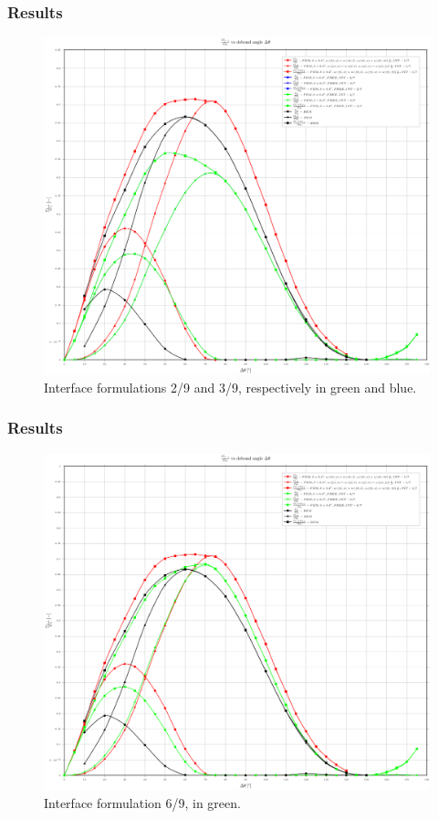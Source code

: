 \documentclass[first,firstsupp,lastsupp,handout,last,hyperref,table]{ETHclass}
\begin{document}
\begin{frame}
\frametitle{Results}
\vspace{-0.7cm}
\centering
\captionsetup[figure]{font=scriptsize,labelfont=scriptsize}
\begin{figure}[!h]
\centering
\includegraphics[height=0.7\textheight]{2017-04-29_05-03_AbqRunSummary_GsoverG0_FEM-BEM-comparison.pdf}
  \caption{\scriptsize Interface formulations 2/9 and 3/9, respectively in green and blue.}
  \label{fig:res3}
\end{figure}
\end{frame}

\begin{frame}
\frametitle{Results}
\vspace{-0.7cm}
\centering
\captionsetup[figure]{font=scriptsize,labelfont=scriptsize}
\begin{figure}[!h]
\centering
\includegraphics[height=0.7\textheight]{2017-06-01_AbqRunSummary_GsoverG0_FEM-BEM-comparison.pdf}
  \caption{\scriptsize Interface formulation 6/9, in green.}
  \label{fig:res4}
\end{figure}
\end{frame}
\end{document}

